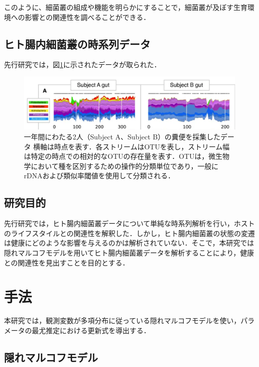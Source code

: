 \documentclass[dvipdfmx,autodetect-engine]{jsreport}
\begin{document}
このように、細菌叢の組成や機能を明らかにすることで，細菌叢が及ぼす生育環境への影響との関連性を調べることができる．


\section{ヒト腸内細菌叢の時系列データ}

先行研究\cite{pmid25146375}では，図\ref{fig:1.1}に示されたデータが取られた．

\begin{figure}[htp]
 \begin{center}
  \includegraphics[scale=0.6]{Picture1.png}
 \end{center}
 \caption{一年間にわたる2人（Subject A、Subject B）の糞便を採集したデータ\cite{pmid25146375}\newline
横軸は時点を表す．各ストリームはOTUを表し，ストリーム幅は特定の時点での相対的なOTUの存在量を表す．OTUは，微生物学において種を区別するための操作的分類単位であり，一般にrDNAおよび類似率閾値を使用して分類される．}\label{fig:1.1}
\end{figure}

\section{研究目的}

先行研究では，ヒト腸内細菌叢データについて単純な時系列解析を行い，ホストのライフスタイルとの関連性を解釈した．しかし，ヒト腸内細菌叢の状態の変遷は健康にどのような影響を与えるのかは解析されていない．そこで，本研究では隠れマルコフモデルを用いてヒト腸内細菌叢データを解析することにより，健康との関連性を見出すことを目的とする．




\chapter{手法}

本研究では，観測変数が多項分布に従っている隠れマルコフモデルを使い，パラメータの最尤推定における更新式を導出する．

\section{隠れマルコフモデル}
\end{document}
